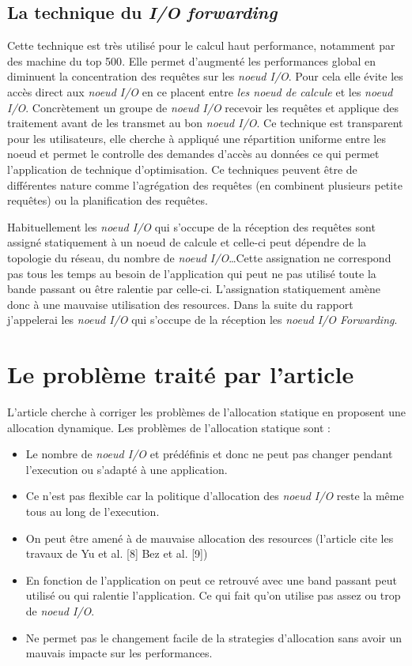 \documentclass[10pt, a4paper]{article}
\begin{document}
\subsection{La technique du \emph{I/O forwarding}}

Cette technique est très utilisé pour le calcul haut performance, notamment par des machine du top 500\cite{}. Elle permet d'augmenté les performances global en diminuent la concentration des requêtes sur les \emph{noeud I/O}. Pour cela elle évite les accès direct aux \emph{noeud I/O} en ce placent entre \emph{les noeud de calcule} et les \emph{noeud I/O}. Concrètement un groupe de \emph{noeud I/O} recevoir les requêtes et applique des traitement avant de les transmet au bon \emph{noeud I/O}. Ce technique est transparent pour les utilisateurs, elle cherche à appliqué une répartition uniforme entre les noeud et permet le controlle des demandes d'accès au données ce qui permet l'application de technique d'optimisation. Ce techniques peuvent être de différentes nature comme l'agrégation des requêtes (en combinent plusieurs petite requêtes) ou la planification des requêtes.

Habituellement les \emph{noeud I/O} qui s'occupe de la réception des requêtes sont assigné statiquement à un noeud de calcule et celle-ci peut dépendre de la topologie du réseau, du nombre de \emph{noeud I/O}\dots Cette assignation ne correspond pas tous les temps au besoin de l'application qui peut ne pas utilisé toute la bande passant ou être ralentie par celle-ci. L'assignation statiquement amène donc à une mauvaise utilisation des resources. Dans la suite du rapport j'appelerai les \emph{noeud I/O} qui s'occupe de la réception les \emph{noeud I/O Forwarding}.

\section{Le problème traité par l'article}

L'article cherche à corriger les problèmes de l'allocation statique en proposent une allocation dynamique.
Les problèmes de l'allocation statique sont :
\begin{itemize}
  \item Le nombre de \emph{noeud I/O} et prédéfinis et donc ne peut pas changer pendant l'execution ou s'adapté à une application.
  \item Ce n'est pas flexible car la politique d'allocation des \emph{noeud I/O} reste la même tous au long de l'execution.
  \item On peut être amené à de mauvaise allocation des resources (l'article cite les travaux de Yu et al. [8] Bez et al. [9])\cite{}
  \item En fonction de l'application on peut ce retrouvé avec une band passant peut utilisé ou qui ralentie l'application. Ce qui fait qu'on utilise pas assez ou trop de \emph{noeud I/O}.
  \item Ne permet pas le changement facile de la strategies d'allocation sans avoir un mauvais impacte sur les performances.
\end{itemize}
\end{document}
